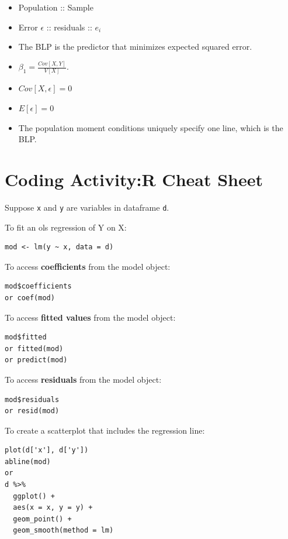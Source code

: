\documentclass[
]{book}
\providecommand{\tightlist}{%
  \setlength{\itemsep}{0pt}\setlength{\parskip}{0pt}}
\theoremstyle{definition}
\theoremstyle{definition}
\theoremstyle{definition}
\theoremstyle{definition}
\theoremstyle{remark}
\begin{document}
\begin{itemize}
\tightlist
\item
  Population :: Sample
\item
  Error \(\epsilon\) :: residuals :: \(e_{i}\)
\item
  The BLP is the predictor that minimizes expected squared error.
\item
  \(\beta_1 = \frac{Cov[X,Y]}{V[X]}\).
\item
  \(Cov[X, \epsilon] = 0\)
\item
  \(E[\epsilon] = 0\)
\item
  The population moment conditions uniquely specify one line, which is the BLP.
\end{itemize}

\hypertarget{coding-activityr-cheat-sheet}{%
\section{Coding Activity:R Cheat Sheet}\label{coding-activityr-cheat-sheet}}

Suppose \texttt{x} and \texttt{y} are variables in dataframe \texttt{d}.

To fit an ols regression of Y on X:

\begin{verbatim}
mod <- lm(y ~ x, data = d)
\end{verbatim}

To access \textbf{coefficients} from the model object:

\begin{verbatim}
mod$coefficients
or coef(mod)
\end{verbatim}

To access \textbf{fitted values} from the model object:

\begin{verbatim}
mod$fitted
or fitted(mod)
or predict(mod)
\end{verbatim}

To access \textbf{residuals} from the model object:

\begin{verbatim}
mod$residuals
or resid(mod)
\end{verbatim}

To create a scatterplot that includes the regression line:

\begin{verbatim}
plot(d['x'], d['y'])
abline(mod)
or 
d %>% 
  ggplot() + 
  aes(x = x, y = y) + 
  geom_point() + 
  geom_smooth(method = lm)
\end{verbatim}
\end{document}
